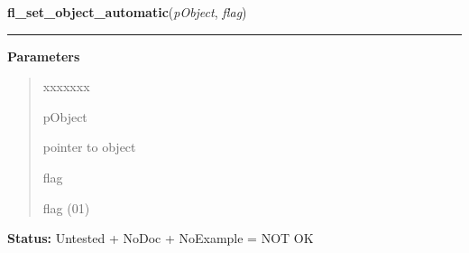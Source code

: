 \hspace{.8\funcindent}\begin{boxedminipage}{\funcwidth}

    \raggedright \textbf{fl\_set\_object\_automatic}(\textit{pObject}, \textit{flag})

    \vspace{-1.5ex}

    \rule{\textwidth}{0.5\fboxrule}
\setlength{\parskip}{2ex}
\setlength{\parskip}{1ex}
      \textbf{Parameters}
      \vspace{-1ex}

      \begin{quote}
        \begin{Ventry}{xxxxxxx}

          \item[pObject]

          pointer to object

          \item[flag]

          flag (0{\textbar}1)

        \end{Ventry}

      \end{quote}

\textbf{Status:} Untested + NoDoc + NoExample = NOT OK



    \end{boxedminipage}

    \label{xformslib:library:fl_object_is_automatic}

    \vspace{0.5ex}

